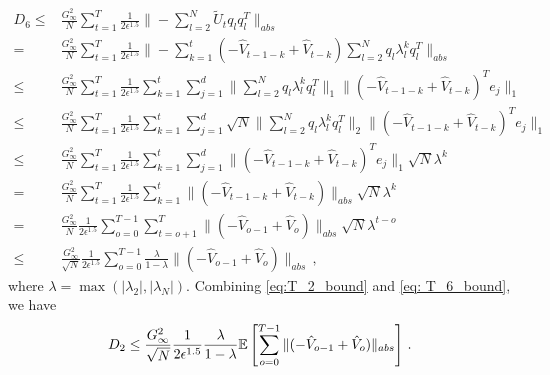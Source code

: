 \documentclass[anon,12pt]{colt2021} %
\begin{document}
\begin{align}\label{eq: T_6_bound}
D_6 \leq & \frac{G_{\infty}^2}{N}\sum_{t=1}^T \frac{1}{2\epsilon^{1.5}}  \| - \sum_{l=2}^N  \tilde U_t q_l q_l^T \|_{abs}  \nonumber\\
=  & \frac{G_{\infty}^2}{N}\sum_{t=1}^T \frac{1}{2\epsilon^{1.5}}  \| -   \sum_{k=1}^t (- \hat V_{t-1-k} + \hat V_{t-k} )  \sum_{l=2}^N q_l \lambda_l^k q_l^T \|_{abs} \nonumber \\ 
\leq &  \frac{G_{\infty}^2}{N}\sum_{t=1}^T \frac{1}{2\epsilon^{1.5}}  \sum_{k=1}^t  \sum_{j=1}^d \| \sum_{l=2}^N q_l \lambda_l^k q_l^T \|_{1}  \|     (- \hat V_{t-1-k} + \hat V_{t-k} )^T e_j \|_1 \nonumber  \\
\leq &  \frac{G_{\infty}^2}{N}\sum_{t=1}^T \frac{1}{2\epsilon^{1.5}}  \sum_{k=1}^t  \sum_{j=1}^d  \sqrt{N}\| \sum_{l=2}^N q_l \lambda_l^k q_l^T \|_{2}  \|     (- \hat V_{t-1-k} + \hat V_{t-k} )^T e_j \|_1 \nonumber  \\
\leq  & \frac{G_{\infty}^2}{N}\sum_{t=1}^T \frac{1}{2\epsilon^{1.5}}  \sum_{k=1}^t \sum_{j=1}^d \|    (- \hat V_{t-1-k} + \hat V_{t-k} )^T e_j\|_1 \sqrt{N} \lambda^k \nonumber \\
=  & \frac{G_{\infty}^2}{N}\sum_{t=1}^T \frac{1}{2\epsilon^{1.5}}  \sum_{k=1}^t  \|    (- \hat V_{t-1-k} + \hat V_{t-k} ) \|_{abs} \sqrt{N} \lambda^k \nonumber \\
=  & \frac{G_{\infty}^2}{N}\frac{1}{2\epsilon^{1.5}} \sum_{o=0}^{T-1} \sum_{t=o+1}^T     \|    (- \hat V_{o-1} + \hat V_{o} ) \|_{abs} \sqrt{N} \lambda^{t-o} \nonumber \\ 
\leq & \frac{G_{\infty}^2}{\sqrt{N}}\frac{1}{2\epsilon^{1.5}} \sum_{o=0}^{T-1} \frac{\lambda}{1-\lambda}     \|    (- \hat V_{o-1} + \hat V_{o} ) \|_{abs} \, ,
\end{align}
where $\lambda = \max (|\lambda_2|,|\lambda_N|)$.
Combining \eqref{eq:T_2_bound} and \eqref{eq: T_6_bound}, we have
\begin{equation}\notag
D_2 \leq  \frac{G_{\infty}^2}{\sqrt{N}}\frac{1}{2\epsilon^{1.5}} \frac{\lambda}{1-\lambda}   \mathbb E \left[ \sum_{o=0}^{T-1}     \|    (- \hat V_{o-1} + \hat V_{o} ) \|_{abs} \right]  \, .
\end{equation}
\end{document}
